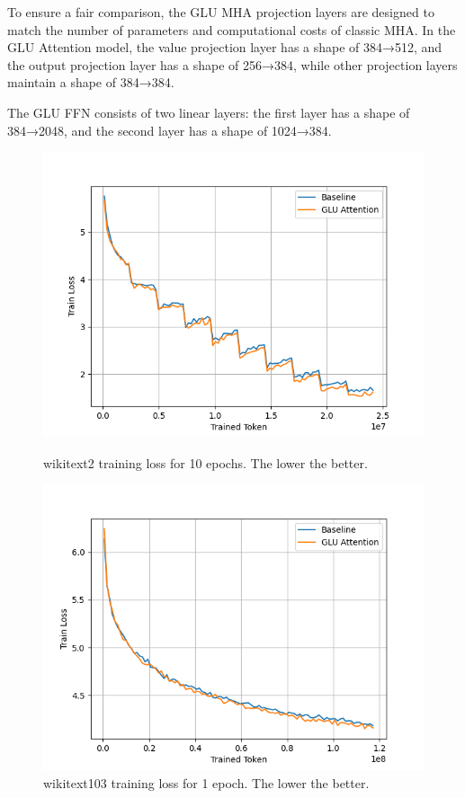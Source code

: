 \documentclass[11pt]{article}
\begin{document}
To ensure a fair comparison, the GLU MHA projection layers are designed to match the number of parameters and computational costs of classic MHA. In the GLU Attention model, the value projection layer has a shape of 384→512, and the output projection layer has a shape of 256→384, while other projection layers maintain a shape of 384→384.

The GLU FFN consists of two linear layers: the first layer has a shape of 384→2048, and the second layer has a shape of 1024→384.

\begin{figure}[htbp]
    \centering
    \begin{minipage}{0.49\textwidth}
        \centering
        \includegraphics[width=\textwidth]{wikitext2_train_loss.png}
        \caption{wikitext2 training loss for 10 epochs. The lower the better.}
        \label{fig:wikitext2_train_loss}
    \end{minipage}
    \begin{minipage}{0.49\textwidth}
        \centering
        \includegraphics[width=\textwidth]{wikitext103_train_loss.png}
        \caption{wikitext103 training loss for 1 epoch. The lower the better.}
        \label{fig:wikitext103_train_loss}
    \end{minipage}
    \hfill
\end{figure}
\end{document}
